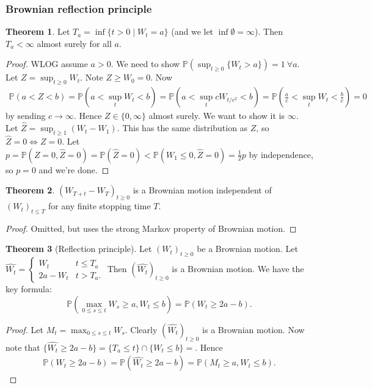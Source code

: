 \documentclass{article}
\theoremstyle{definition}
\newtheorem{theorem}{Theorem}[section]
\begin{document}
\subsubsection{Brownian reflection principle}
\begin{theorem}
    Let $T_a = \inf \{t>0 \mid W_t=a\}$ (and we let $\inf \emptyset = \infty$). Then $T_a< \infty$ almost surely for all $a$.
\end{theorem}
\begin{proof}
    WLOG assume $a>0$. We need to show $\mathbb{P}(\sup_{t\ge 0} \{W_t>a\})=1 ~\forall a$. Let $Z = \sup_{t\ge 0}W_t$. Note $Z\ge W_0 = 0$. Now
    \begin{align*}
        \mathbb{P}(a < Z < b) = \mathbb{P}(a < \sup_t W_t < b) = \mathbb{P}(a < \sup_t c W_{t/c^2} <b) = \mathbb{P}\left(\frac{a}{c} < \sup_t W_t < \frac{b}{c}\right) = 0
    \end{align*}
    by sending $c \to \infty$. Hence $Z \in \{0,\infty\}$ almost surely. We want to show it is $\infty$. Let $\hat{Z} = \sup_{t\ge 1}(W_t-W_1)$. This has the same distribution as $Z$, so $\hat{Z}=0 \iff Z=0$. Let $p= \mathbb{P}(Z=0,\hat{Z}=0)=\mathbb{P}(\hat{Z}=0)<\mathbb{P}(W_1\le 0, \hat{Z}=0) = \frac{1}{2}p$ by independence, so $p=0$ and we're done. 
\end{proof}
\begin{theorem}
    $(W_{T+t}-W_T)_{t\ge 0}$ is a Brownian motion independent of $(W_t)_{t\le T}$ for any finite stopping time $T$.
\end{theorem}
\begin{proof}
    Omitted, but uses the strong Markov property of Brownian motion.
\end{proof}
\begin{theorem}[Reflection principle]
    Let $(W_t)_{t\ge 0}$ be a Brownian motion. Let $\hat{W_t} = \begin{cases}
        W_t &t\le T_a\\
        2a-W_t &t>T_a.
    \end{cases}$
    Then $(\hat{W_t})_{t\ge 0}$ is a Brownian motion. We have the key formula:
    \[
    \mathbb{P}(\max_{0\le s\le t} W_s\ge a, W_t\le b) = \mathbb{P}(W_t\ge 2a-b).
    \]
\end{theorem}
\begin{proof}
    Let $M_t = \max_{0\le s\le t}W_s$.
    Clearly $(\hat{W_t})_{t\ge 0}$ is a Brownian motion. Now note that $\{\hat{W_t} \ge 2a-b\} = \{T_a \le t\} \cap \{W_t \le b\} = $. Hence
    \begin{align*}
        \mathbb{P}(W_t \ge 2a-b) = \mathbb{P}(\hat{W_t} \ge 2a-b) = \mathbb{P}(M_t \ge a, W_t\le b).
    \end{align*}
\end{proof}
\end{document}
